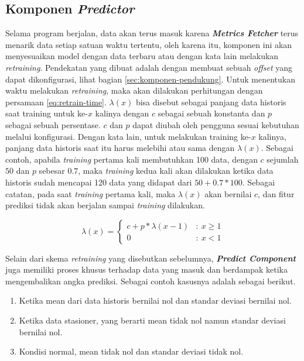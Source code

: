 \subsection{Komponen \textit{Predictor}}

Selama program berjalan, data akan terus masuk karena \textbf{\textit{Metrics Fetcher}} terus menarik data setiap satuan waktu tertentu, oleh karena itu, komponen ini akan menyesuaikan model dengan data terbaru atau dengan kata lain melakukan \textit{retraining}. Pendekatan yang dibuat adalah dengan membuat sebuah \textit{offset} yang dapat dikonfigurasi, lihat bagian \ref{sec:komponen-pendukung}. Untuk menentukan waktu melakukan \textit{retraining}, maka akan dilakukan perhitungan dengan persamaan \ref{eq:retrain-time}. $\lambda(x)$ bisa disebut sebagai panjang data historis saat training untuk ke-$x$ kalinya dengan $c$ sebagai sebuah konstanta dan $p$ sebagai sebuah persentase. $c$ dan $p$ dapat diubah oleh pengguna sesuai kebutuhan melalui konfigurasi. Dengan kata lain, untuk melakukan training ke-$x$ kalinya, panjang data historis saat itu harus melebihi atau sama dengan $\lambda(x)$. Sebagai contoh, apabila \textit{training} pertama kali membutuhkan 100 data, dengan $c$ sejumlah $50$ dan $p$ sebesar $0.7$, maka \textit{training} kedua kali akan dilakukan ketika data historis sudah mencapai 120 data yang didapat dari $50+0.7*100$. Sebagai catatan, pada saat \textit{training} pertama kali, maka $\lambda(x)$ akan bernilai $c$, dan fitur prediksi tidak akan berjalan sampai \textit{training} dilakukan.

\begin{equation}
    \label{eq:retrain-time}
    \lambda(x) =
        \left\{
        \begin{array}{cl}
            c + p*\lambda(x-1) & : \ x \geq 1 \\
            0 & : \ x < 1
        \end{array}
        \right.
\end{equation}

Selain dari skema \textit{retraining} yang disebutkan sebelumnya, \textbf{\textit{Predict Component}} juga memiliki proses khusus terhadap data yang masuk dan berdampak ketika mengembalikan angka prediksi. Sebagai contoh kasusnya adalah sebagai berikut.
\begin{enumerate}
    \item Ketika mean dari data historis bernilai nol dan standar deviasi bernilai nol.
    \item Ketika data stasioner, yang berarti mean tidak nol namun standar deviasi bernilai nol.
    \item Kondisi normal, mean tidak nol dan standar deviasi tidak nol.
\end{enumerate}

